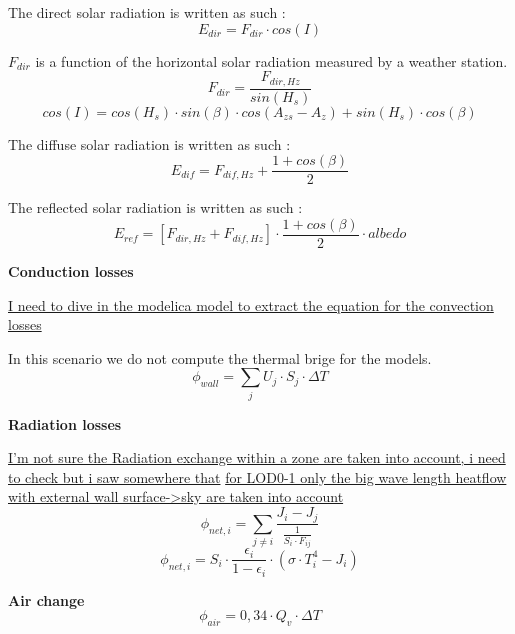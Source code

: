\documentclass[runningheads]{llncs}
\begin{document}
The direct solar radiation is written as such :
\begin{equation}
  E_{dir}=F_{dir}\cdot cos(I)
\end{equation}

$F_{dir}$ is a function of the horizontal solar radiation measured by a weather station.
\begin{equation}
  F_{dir}=\frac{F_{dir,Hz}}{sin(H_s)}
\end{equation}
\begin{equation}
  cos(I)=cos(H_s)\cdot sin(\beta)\cdot cos(A_{zs}-A_{z})+sin(H_s)\cdot cos(\beta)
\end{equation}

The diffuse solar radiation is written as such :
\begin{equation}
  E_{dif}=F_{dif,Hz}+\frac{1+cos(\beta)}{2}
\end{equation}

The reflected solar radiation is written as such :
\begin{equation}
  E_{ref}=[F_{dir,Hz}+F_{dif,Hz}]\cdot \frac{1+cos(\beta)}{2}\cdot albedo
\end{equation}

\textbf{Conduction losses}

\underline {I need to dive in the modelica model to extract the equation for the convection losses}

In this scenario we do not compute the thermal brige for the models.
\begin{equation}
  \phi_{wall}=\sum_{j} U_j\cdot S_j\cdot \Delta T
\end{equation}

\textbf{Radiation losses}

\underline{I'm not sure the Radiation exchange within a zone are taken into account, i need to check but i saw somewhere that} 
\underline{for LOD0-1 only the big wave length heatflow with external wall surface->sky are taken into account}
\begin{equation}
  \phi_{net,i}=\sum_{j\not=i}\frac{J_i-J_j}{\frac{1}{S_i\cdot F_{ij}}}
\end{equation}
\begin{equation}
  \phi_{net,i}=S_i\cdot \frac{\epsilon_i}{1-\epsilon_i}\cdot (\sigma\cdot T_i^4-J_i)
\end{equation}

\textbf{Air change}
\begin{equation}
  \phi_{air}=0,34\cdot Q_v\cdot \Delta T
\end{equation}
\end{document}

